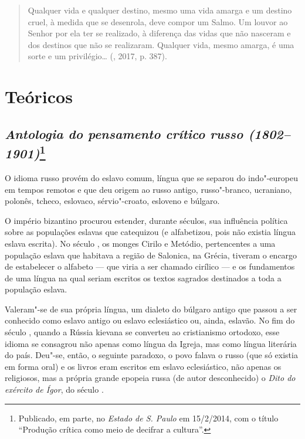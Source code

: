 \begin{quotation}
Qualquer vida e qualquer destino, mesmo uma
vida amarga e um destino cruel, à medida que se desenrola, deve compor um
Salmo. Um louvor ao Senhor por ela ter se realizado, à diferença das vidas
que não nasceram e dos destinos que não se realizaram. Qualquer vida,
mesmo amarga, é uma sorte e um privilégio\ldots{} (, 2017, p. 387).
\end{quotation}

\part{Teóricos}

\chapter{\emph{Antologia do pensamento crítico russo (1802--1901)}\footnote{Publicado, em parte, no \emph{Estado de S. Paulo} em 15/2/2014, com o título ``Produção crítica como meio de decifrar a cultura''.}}
\label{pensamentocritico}

O idioma russo provém do eslavo comum, língua que se separou do
indo"-europeu em tempos remotos e que deu origem ao russo antigo,
russo"-branco, ucraniano, polonês, tcheco, eslovaco, sérvio"-croato,
esloveno e búlgaro.

O império bizantino procurou estender, durante séculos, sua influência
política sobre as populações eslavas que catequizou (e alfabetizou, pois
não existia língua eslava escrita). No século , os monges Cirilo e
Metódio, pertencentes a uma população eslava que habitava a região de
Salonica, na Grécia, tiveram o encargo de estabelecer o alfabeto --- que
viria a ser chamado cirílico --- e os fundamentos de uma língua na qual
seriam escritos os textos sagrados destinados a toda a população eslava.

Valeram"-se de sua própria língua, um dialeto do búlgaro antigo que
passou a ser conhecido como eslavo antigo ou eslavo eclesiástico ou,
ainda, eslavão. No fim do século , quando a Rússia kievana se
converteu ao cristianismo ortodoxo, esse idioma se consagrou não apenas
como língua da Igreja, mas como língua literária do país. Deu"-se, então,
o seguinte paradoxo, o povo falava o russo (que só existia em forma
oral) e os livros eram
escritos em eslavo eclesiástico, não apenas os religiosos, mas a própria
grande epopeia russa (de autor desconhecido) o \emph{Dito do exército de
Ígor}, do século .

